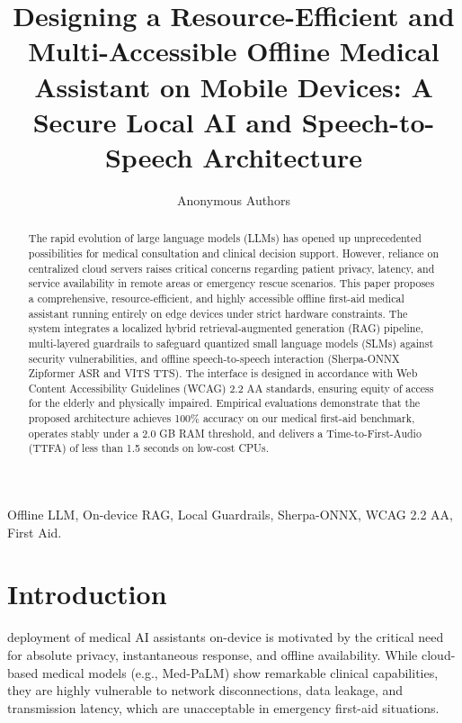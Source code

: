\documentclass[journal,compsoc]{IEEEtran}
\begin{document}
\title{Designing a Resource-Efficient and Multi-Accessible Offline Medical Assistant on Mobile Devices: A Secure Local AI and Speech-to-Speech Architecture}

\author{Anonymous Authors}

\maketitle

\begin{abstract}
The rapid evolution of large language models (LLMs) has opened up unprecedented possibilities for medical consultation and clinical decision support. However, reliance on centralized cloud servers raises critical concerns regarding patient privacy, latency, and service availability in remote areas or emergency rescue scenarios. This paper proposes a comprehensive, resource-efficient, and highly accessible offline first-aid medical assistant running entirely on edge devices under strict hardware constraints. The system integrates a localized hybrid retrieval-augmented generation (RAG) pipeline, multi-layered guardrails to safeguard quantized small language models (SLMs) against security vulnerabilities, and offline speech-to-speech interaction (Sherpa-ONNX Zipformer ASR and VITS TTS). The interface is designed in accordance with Web Content Accessibility Guidelines (WCAG) 2.2 AA standards, ensuring equity of access for the elderly and physically impaired. Empirical evaluations demonstrate that the proposed architecture achieves 100\% accuracy on our medical first-aid benchmark, operates stably under a 2.0 GB RAM threshold, and delivers a Time-to-First-Audio (TTFA) of less than 1.5 seconds on low-cost CPUs.
\end{abstract}

\begin{IEEEkeywords}
Offline LLM, On-device RAG, Local Guardrails, Sherpa-ONNX, WCAG 2.2 AA, First Aid.
\end{IEEEkeywords}

\section{Introduction}
 deployment of medical AI assistants on-device is motivated by the critical need for absolute privacy, instantaneous response, and offline availability. While cloud-based medical models (e.g., Med-PaLM) show remarkable clinical capabilities, they are highly vulnerable to network disconnections, data leakage, and transmission latency, which are unacceptable in emergency first-aid situations. 
\end{document}
